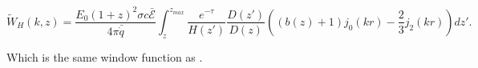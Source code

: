 \documentclass[twocolumns]{emulateapj}
\begin{document}
\begin{equation}
  \label{eq:heat_fluc}
  \tilde{W}_H(k,z)=\frac{E_0(1+z)^2\sigma c \mathcal{\bar{E}}}{4\pi\bar{\dot{q}}}\int_z^{z_{max}} \frac{e^{-\tau}}{H(z')}\frac{D(z')}{D(z)}\left((b(z)+1)j_0(kr)-\frac{2}{3}j_2(kr)\right)dz'.
\end{equation}

Which is the same window function as  \citet{2007MNRAS.376.1680P,2005ApJ...626....1B}. 





 
\end{document}
